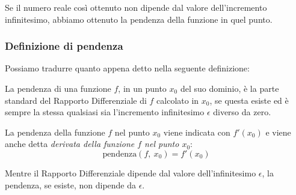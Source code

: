 Se il numero reale così ottenuto non dipende dal valore dell'incremento 
infinitesimo, abbiamo ottenuto la pendenza della funzione in quel punto.

\subsubsection{Definizione di pendenza}
% 
Possiamo tradurre quanto appena detto nella seguente definizione: 
\begin{definizione}
La pendenza di una funzione \(f\), in un punto \(x_0\) del suo dominio, 
è la parte standard del Rapporto Differenziale di \(f\) calcolato in 
\(x_0\), se questa esiste ed è sempre la stessa qualsiasi sia 
l'incremento infinitesimo \(\epsilon\) diverso da zero.
\end{definizione}

La pendenza della funzione \(f\) nel punto \(x_0\) viene indicata con 
\(f'(x_0)\) e viene anche detta \emph{derivata della funzione 
\(f\) nel punto \(x_0\)}:
\[\text{pendenza}(f,~x_0) = f'(x_0)\]

\begin{osservazione}
Mentre il Rapporto Differenziale dipende dal valore dell'infinitesimo 
\(\epsilon\), la pendenza, se esiste, non dipende da \(\epsilon\).
\end{osservazione}

